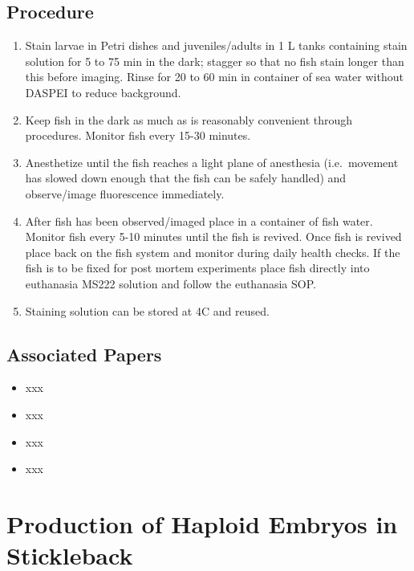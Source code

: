 \documentclass[
  letterpaper,
  DIV=11,
  numbers=noendperiod]{scrreprt}
\providecommand{\tightlist}{%
  \setlength{\itemsep}{0pt}\setlength{\parskip}{0pt}}\usepackage{longtable,booktabs,array}
\begin{document}
\hypertarget{procedure-82}{%
\section{Procedure}\label{procedure-82}}

\begin{enumerate}
\def\labelenumi{\arabic{enumi}.}
\tightlist
\item
  Stain larvae in Petri dishes and juveniles/adults in 1 L tanks
  containing stain solution for 5 to 75 min in the dark; stagger so that
  no fish stain longer than this before imaging. Rinse for 20 to 60 min
  in container of sea water without DASPEI to reduce background.
\item
  Keep fish in the dark as much as is reasonably convenient through
  procedures. Monitor fish every 15-30 minutes.
\item
  Anesthetize until the fish reaches a light plane of anesthesia
  (i.e.~movement has slowed down enough that the fish can be safely
  handled) and observe/image fluorescence immediately.
\item
  After fish has been observed/imaged place in a container of fish
  water. Monitor fish every 5-10 minutes until the fish is revived. Once
  fish is revived place back on the fish system and monitor during daily
  health checks. If the fish is to be fixed for post mortem experiments
  place fish directly into euthanasia MS222 solution and follow the
  euthanasia SOP.
\item
  Staining solution can be stored at 4C and reused.
\end{enumerate}

\hypertarget{associated-papers-57}{%
\section{Associated Papers}\label{associated-papers-57}}

\begin{itemize}
\tightlist
\item
  xxx
\item
  xxx
\item
  xxx
\item
  xxx
\end{itemize}

\hypertarget{sec-vert_exp-haploid_SB}{%
\chapter{Production of Haploid Embryos in
Stickleback}\label{sec-vert_exp-haploid_SB}}
\end{document}
